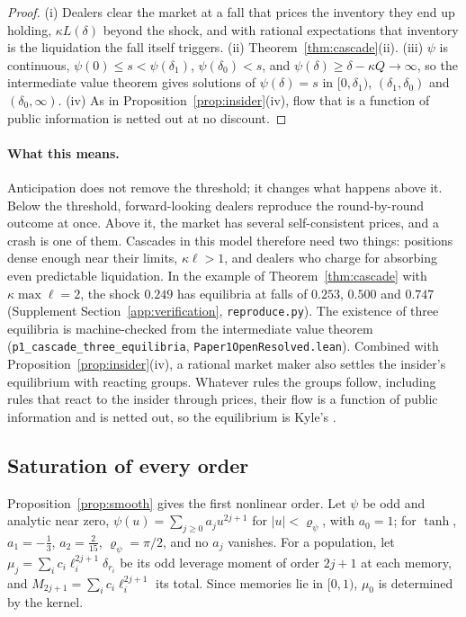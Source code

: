 \documentclass[12pt]{article}
\theoremstyle{definition}
\theoremstyle{remark}
\begin{document}
\begin{proof}
(i) Dealers clear the market at a fall that prices the inventory they end up holding, $\kappa L(\delta)$ beyond the shock, and with rational expectations that inventory is the liquidation the fall itself triggers. (ii) Theorem~\ref{thm:cascade}(ii). (iii) $\psi$ is continuous, $\psi(0)\le s<\psi(\delta_1)$, $\psi(\delta_0)<s$, and $\psi(\delta)\ge\delta-\kappa Q\to\infty$, so the intermediate value theorem gives solutions of $\psi(\delta)=s$ in $[0,\delta_1)$, $(\delta_1,\delta_0)$ and $(\delta_0,\infty)$. (iv) As in Proposition~\ref{prop:insider}(iv), flow that is a function of public information is netted out at no discount.
\end{proof}

\paragraph{What this means.} Anticipation does not remove the threshold; it changes what happens above it. Below the threshold, forward-looking dealers reproduce the round-by-round outcome at once. Above it, the market has several self-consistent prices, and a crash is one of them. Cascades in this model therefore need two things: positions dense enough near their limits, $\kappa\ell>1$, and dealers who charge for absorbing even predictable liquidation. In the example of Theorem~\ref{thm:cascade} with $\kappa\max\ell=2$, the shock $0.249$ has equilibria at falls of $0.253$, $0.500$ and $0.747$ (Supplement Section~\ref{app:verification}, \nolinkurl{reproduce.py}). The existence of three equilibria is machine-checked from the intermediate value theorem (\texttt{p1\_cascade\_three\_equilibria}, \nolinkurl{Paper1OpenResolved.lean}). Combined with Proposition~\ref{prop:insider}(iv), a rational market maker also settles the insider's equilibrium with reacting groups. Whatever rules the groups follow, including rules that react to the insider through prices, their flow is a function of public information and is netted out, so the equilibrium is Kyle's \citep{kyle1985}.

\subsection{Saturation of every order}

Proposition~\ref{prop:smooth} gives the first nonlinear order. Let $\psi$ be odd and analytic near zero, $\psi(u)=\sum_{j\ge0}a_ju^{2j+1}$ for $|u|<\varrho_\psi$, with $a_0=1$; for $\tanh$, $a_1=-\frac13$, $a_2=\frac2{15}$, $\varrho_\psi=\pi/2$, and no $a_j$ vanishes. For a population, let $\mu_j=\sum_ic_i\ell_i^{2j+1}\delta_{r_i}$ be its odd leverage moment of order $2j+1$ at each memory, and $M_{2j+1}=\sum_ic_i\ell_i^{2j+1}$ its total. Since memories lie in $[0,1)$, $\mu_0$ is determined by the kernel.
\end{document}

